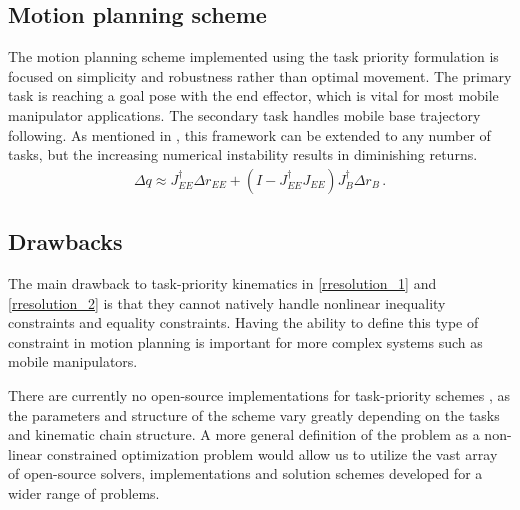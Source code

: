 \documentclass[times, utf8, diplomski, english]{fer}
\begin{document}
\subsection{Motion planning scheme}
The motion planning scheme implemented using the task priority formulation is focused on simplicity and robustness rather than optimal movement.
The primary task is reaching a goal pose with the end effector, which is vital for most mobile manipulator applications. 
The secondary task handles mobile base trajectory following.
As mentioned in , this framework can be extended to any number of tasks, but the increasing numerical instability results in diminishing returns.
\begin{align}
\label{rresolution_3}
\Delta q \approx J_{EE}^{\dagger}\Delta r_{EE} + \left(I - J_{EE}^{\dagger}J_{EE}\right)J_{B}^{\dagger}\Delta r_{B}\, .
\end{align}

\subsection{Drawbacks}\label{subsec:tp drawbacks}
The main drawback to task-priority kinematics in \eqref{rresolution_1} and \eqref{rresolution_2} is that they cannot natively handle nonlinear inequality constraints \citep{moe2016set} and equality constraints. 
Having the ability to define this type of constraint in motion planning is important for more complex systems such as mobile manipulators.

There are currently no open-source implementations for task-priority schemes , as the parameters and structure of the 
scheme vary greatly depending on the tasks and kinematic chain structure.
A more general definition of the problem as a non-linear constrained optimization problem would allow us to utilize the vast array of open-source solvers, implementations and solution schemes developed for a wider range of problems.
\end{document}
